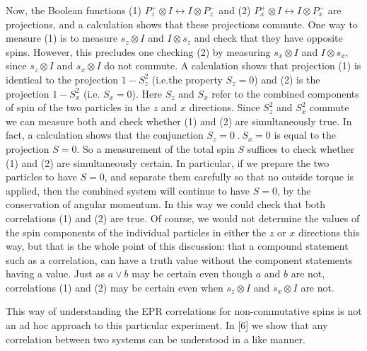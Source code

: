 \documentclass[12pt]{article}
\begin{document}
 Now, the Boolean functions (1) $P_z^+\otimes I\leftrightarrow I\otimes P_z^-$  and (2) $P_x^+\otimes I \leftrightarrow I\otimes P_x^-$ are projections, and a calculation shows that these projections commute. One way to measure (1) is to measure $s_z\otimes I$ and $I\otimes s_z$ and check that they have opposite spins. However, this precludes one checking (2) by measuring $s_x\otimes I$ and $I\otimes s_x$, since $s_z\otimes I$ and $s_x\otimes I$ do not commute. A calculation shows that projection (1) is identical to the projection $1-S_z^2$   (i.e.the property $S_z = 0$) and (2) is the projection $1- S_x^2$ (i.e. $S_x = 0$). Here $S_z$ and $S_x$ refer to the combined components of spin of the two particles in the $z$ and $x$ directions. Since $S_z^2$ and $S_x^2$ commute we can measure both and check whether (1) and (2) are simultaneously true. In fact, a calculation shows that the conjunction $S_z = 0\ .  \ S_x = 0$ is equal to the projection $S = 0.$ So a measurement of the total spin $S$ suffices to check whether (1) and (2) are simultaneously certain. In particular, if we prepare the two particles to have $S=0$, and separate them carefully so that no outside torque is applied, then the combined system will continue to have $S=0$, by the conservation of angular momentum. In this way we could check that both correlations (1) and (2) are true.  Of course, we would not determine the values of the spin components of the individual particles  in either the $z$ or $x$ directions this way, but that is the whole point of this discussion: that a compound statement such as a correlation, can have a truth value without the component statements having a value. Just as $a \vee b$ may be certain even though $a$ and $b$ are not, correlations (1) and (2) may be certain even when $s_z\otimes I$ and $s_x\otimes I$ are not.

 This way of understanding the EPR correlations for non-commutative spins is not an ad hoc approach to this particular experiment. In [6]  we show that any correlation between two systems can be understood in a like manner.                                
\end{document}

